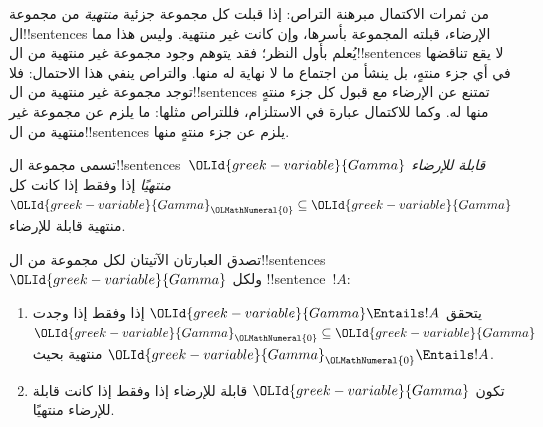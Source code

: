 \documentclass[../../../include/open-logic-section]{subfiles}
\begin{document}
      {}
      {}


من ثمرات الاكتمال مبرهنة التراص: إذا قبلت كل مجموعة جزئية
\emph{منتهية} من مجموعة ال!!{sentence}s الإرضاء، قبلته المجموعة
بأسرها، وإن كانت غير منتهية. وليس هذا مما يُعلم بأول النظر؛ فقد يتوهم
وجود مجموعة غير منتهية من ال!!{sentence}s لا يقع تناقضها في أي جزء
منتهٍ، بل ينشأ من اجتماع ما لا نهاية له منها. والتراص ينفي هذا
الاحتمال: فلا توجد مجموعة غير منتهية من ال!!{sentence}s تمتنع عن
الإرضاء مع قبول كل جزء منتهٍ منها له. وكما للاكتمال عبارة في
الاستلزام، فللتراص مثلها: ما يلزم عن مجموعة غير منتهية من
ال!!{sentence}s يلزم عن جزء منتهٍ منها.

\begin{defn}
  تسمى مجموعة ال!!{sentence}s~${\OLId{greek-variable}{Gamma}}$ \emph{قابلة للإرضاء منتهيًا} إذا
  وفقط إذا كانت كل ${\OLId{greek-variable}{Gamma}}_{\OLMathNumeral{0}} \subseteq {\OLId{greek-variable}{Gamma}}$ منتهية قابلة للإرضاء.
\end{defn}

\begin{thm}
تصدق العبارتان الآتيتان لكل مجموعة من ال!!{sentence}s~${\OLId{greek-variable}{Gamma}}$ ولكل
!!{sentence}~$!A$:
\begin{enumerate}
  \item يتحقق ${\OLId{greek-variable}{Gamma}} \Entails !A$ إذا وفقط إذا وجدت
    ${\OLId{greek-variable}{Gamma}}_{\OLMathNumeral{0}} \subseteq {\OLId{greek-variable}{Gamma}}$ منتهية بحيث ${\OLId{greek-variable}{Gamma}}_{\OLMathNumeral{0}} \Entails !A$.
  \item تكون ${\OLId{greek-variable}{Gamma}}$ قابلة للإرضاء إذا وفقط إذا كانت قابلة للإرضاء
    منتهيًا.
\end{enumerate}
\end{thm}
\end{document}

